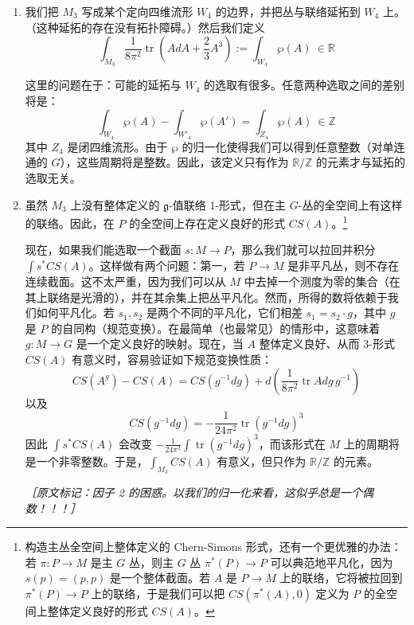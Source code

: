\begin{enumerate}
  \item 我们把 $M_3$ 写成某个定向四维流形 $W_4$ 的边界，并把丛与联络延拓到 $W_4$ 上。（这种延拓的存在没有拓扑障碍。）然后我们定义
  \begin{equation}
    \int_{M_3}\frac{1}{8\pi^2}\operatorname{tr}\left(AdA+\frac23A^3\right)
    :=\int_{W_4}\wp(A)\ \in\mathbb{R}
    \tag{3.9}
    \label{eq:3.9}
  \end{equation}

  这里的问题在于：可能的延拓与 $W_4$ 的选取有很多。任意两种选取之间的差别将是：
  \begin{equation}
    \int_{W_4}\wp(A)-\int_{W'_4}\wp(A')=\int_{Z_4}\wp(A)\ \in\mathbb{Z}
    \tag{3.10}
    \label{eq:3.10}
  \end{equation}
  其中 $Z_4$ 是闭四维流形。由于 $\wp$ 的归一化使得我们可以得到任意整数（对单连通的 $G$），这些周期将是整数。因此，该定义只有作为 $\mathbb{R}/\mathbb{Z}$ 的元素才与延拓的选取无关。

  \item 虽然 $M_3$ 上没有整体定义的 $\mathfrak{g}$-值联络 1-形式，但在主 $G$-丛的全空间上有这样的联络。因此，在 $P$ 的全空间上存在定义良好的形式 $CS(A)$。\footnote{构造主丛全空间上整体定义的 Chern-Simons 形式，还有一个更优雅的办法：若 $\pi:P\to M$ 是主 $G$ 丛，则主 $G$ 丛 $\pi^*(P)\to P$ 可以典范地平凡化，因为 $s(p)=(p,p)$ 是一个整体截面。若 $A$ 是 $P\to M$ 上的联络，它将被拉回到 $\pi^*(P)\to P$ 上的联络，于是我们可以把 $CS(\pi^*(A),0)$ 定义为 $P$ 的全空间上整体定义良好的形式 $CS(A)$。}

  现在，如果我们能选取一个截面 $s:M\to P$，那么我们就可以拉回并积分 $\int s^*CS(A)$。这样做有两个问题：第一，若 $P\to M$ 是非平凡丛，则不存在连续截面。这不太严重，因为我们可以从 $M$ 中去掉一个测度为零的集合（在其上联络是光滑的），并在其余集上把丛平凡化。然而，所得的数将依赖于我们如何平凡化。若 $s_1,s_2$ 是两个不同的平凡化，它们相差 $s_1=s_2\cdot g$，其中 $g$ 是 $P$ 的自同构（规范变换）。在最简单（也最常见）的情形中，这意味着 $g:M\to G$ 是一个定义良好的映射。现在，当 $A$ 整体定义良好、从而 3-形式 $CS(A)$ 有意义时，容易验证如下规范变换性质：
  \begin{equation}
    CS(A^g)-CS(A)=CS(g^{-1}dg)+d\left(\frac{1}{8\pi^2}\operatorname{tr}Adg\,g^{-1}\right)
    \tag{3.11}
    \label{eq:3.11}
  \end{equation}
  以及
  \begin{equation}
    CS(g^{-1}dg)=-\frac{1}{24\pi^2}\operatorname{tr}\left(g^{-1}dg\right)^3
    \tag{3.12}
    \label{eq:3.12}
  \end{equation}
  因此 $\int s^*CS(A)$ 会改变 $-\frac{1}{24\pi^2}\int\operatorname{tr}(g^{-1}dg)^3$，而该形式在 $M$ 上的周期将是一个非零整数。于是，$\int_{M_3}CS(A)$ 有意义，但只作为 $\mathbb{R}/\mathbb{Z}$ 的元素。

  {\small\itshape ［原文标记：因子 2 的困惑。以我们的归一化来看，这似乎总是一个偶数！！！］}

\end{enumerate}
